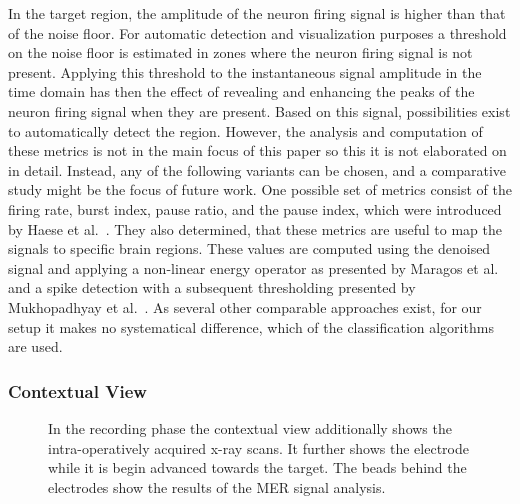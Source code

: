 \documentclass[review]{vgtc}                 %
\begin{document}
In the target region, the amplitude of the neuron firing signal is higher than that of the noise floor. For automatic detection and visualization purposes a threshold on the noise floor is estimated in zones where the neuron firing signal is not present. Applying this threshold to the instantaneous signal amplitude in the time domain has then the effect of revealing and enhancing the peaks of the neuron firing signal when they are present. Based on this signal, possibilities exist to automatically detect the region. However, the analysis and computation of these metrics is not in the main focus of this paper so this it is not elaborated on in detail. Instead, any of the following variants can be chosen, and a comparative study might be the focus of future work. One possible set of metrics consist of the firing rate, burst index, pause ratio, and the pause index, which were introduced by Haese et al.~\cite{Haese2005}. They also determined, that these metrics are useful to map the signals to specific brain regions. These values are computed using the denoised signal and applying a non-linear energy operator as presented by Maragos et al.~\cite{Maragos1993} and a spike detection with a subsequent thresholding presented by Mukhopadhyay et al.~\cite{Mukhopadhyay1998}. As several other comparable approaches exist, for our setup it makes no systematical difference, which of the classification algorithms are used.

\subsubsection{Contextual View}\label{sec:overview:recording:3d}
\begin{figure}
    \centering
    \caption{In the recording phase the contextual view additionally shows the intra-operatively acquired x-ray scans. It further shows the electrode while it is begin advanced towards the target. The beads behind the electrodes show the results of the MER signal analysis.}
    \label{fig:recordingphase:3d}
\end{figure}
\end{document}
